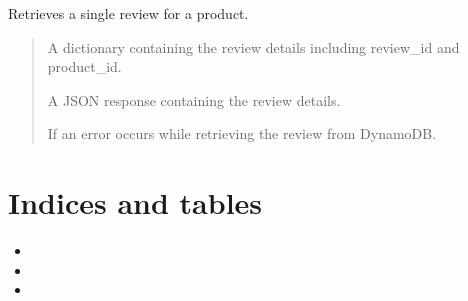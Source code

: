 \documentclass[letterpaper,10pt,english]{sphinxmanual}
\begin{document}

\begin{fulllineitems}
\label{\detokenize{routes_reviews:routes_reviews.route_get_review}}
\pysigstartsignatures
{}
\pysigstopsignatures
\sphinxAtStartPar
Retrieves a single review for a product.
\begin{quote}\begin{description}
\sphinxAtStartPar
{} \textendash{} A dictionary containing the review details including review\_id and product\_id.

\sphinxAtStartPar
A JSON response containing the review details.

\sphinxAtStartPar
{} \textendash{} If an error occurs while retrieving the review from DynamoDB.

\end{description}\end{quote}

\end{fulllineitems}


\begin{fulllineitems}
\label{\detokenize{routes_reviews:routes_reviews.test}}
\pysigstartsignatures
{}
\pysigstopsignatures
\end{fulllineitems}



\chapter{Indices and tables}
\label{\detokenize{index:indices-and-tables}}\begin{itemize}
\item {} 
\sphinxAtStartPar
{}

\item {} 
\sphinxAtStartPar
{}

\item {} 
\sphinxAtStartPar
{}

\end{itemize}


\renewcommand{\indexname}{Python Module Index}
\begin{sphinxtheindex}
\let\bigletter\sphinxstyleindexlettergroup
\bigletter{r}
\item\relax{}
\end{sphinxtheindex}

\renewcommand{\indexname}{Index}
\printindex
\end{document}
